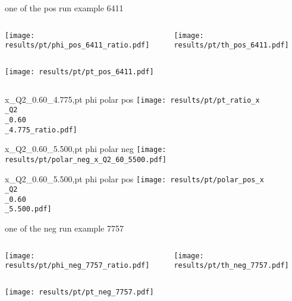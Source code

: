 \begin{frame}{one of the pos run example 6411}
\begin{columns}
\begin{column}[T]{0.5\textwidth}
\texttt{[image: results/pt/phi\_pos\_6411\_ratio.pdf]}
\end{column}
\begin{column}[T]{0.5\textwidth}
\texttt{[image: results/pt/th\_pos\_6411.pdf]}
\end{column}
\end{columns}
\begin{columns}
\begin{column}[T]{0.5\textwidth}
\texttt{[image: results/pt/pt\_pos\_6411.pdf]}
\end{column}
\begin{column}[T]{0.5\textwidth}
\end{column}
\end{columns}
\end{frame}
\begin{frame}{x\_Q2\_0.60\_4.775,pt phi polar pos}
\texttt{[image: results/pt/pt\_ratio\_x\\\_Q2\\\_0.60\\\_4.775\_ratio.pdf]}
\end{frame}
\begin{frame}{x\_Q2\_0.60\_5.500,pt phi polar neg}
\texttt{[image: results/pt/polar\_neg\_x\_Q2\_60\_5500.pdf]}
\end{frame}
\begin{frame}{x\_Q2\_0.60\_5.500,pt phi polar pos}
\texttt{[image: results/pt/polar\_pos\_x\\\_Q2\\\_0.60\\\_5.500.pdf]}
\end{frame}
\begin{frame}{one of the neg run example 7757}
\begin{columns}
\begin{column}[T]{0.5\textwidth}
\texttt{[image: results/pt/phi\_neg\_7757\_ratio.pdf]}
\end{column}
\begin{column}[T]{0.5\textwidth}
\texttt{[image: results/pt/th\_neg\_7757.pdf]}
\end{column}
\end{columns}
\texttt{[image: results/pt/pt\_neg\_7757.pdf]}
\end{frame}
